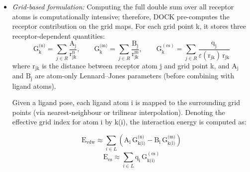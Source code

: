 \documentclass[12pt]{article}
\begin{document}
\begin{itemize}
For identical atoms with vdW radius R and well depth $\varepsilon$, DOCK employs a generalised Lennard--Jones expression:
 \begin{equation}
  V_{\text{LJ}}(r) = \varepsilon
    \left[
      C \left( \frac{R}{r} \right)^{n}
      -
      D \left( \frac{R}{r} \right)^{m}
    \right]
 \end{equation}
with exponents $n > m$ (e.g. n = 12, m = 6 or n = 9, m = 6).  Constants C and D are chosen such that:

\begin{equation}
\begin{aligned}
  V_{\textrm{LJ}}(r = R) &= -\varepsilon, \\
  \frac{\textrm{d} V_{\textrm{LJ}}}{\textrm{d}r}\biggr|_{r = R} &= 0
\end{aligned}
\end{equation}

which fixes the position and depth of the potential minimum while allowing the repulsive wall to be softened by reducing the 12-6 potentials to 9-6.

\item \emph{Grid-based formulation:}
Computing the full double sum over all receptor atoms is computationally intensive; therefore, DOCK pre-computes the receptor contribution on the grid maps\cite{CH7_Meng1992Grid}. For each grid point k, it stores three receptor-dependent
quantities:
\begin{equation}
  \textrm{G}^\textrm{(n)}_\textrm{k} = \sum_{j \in R}
    \frac{\textrm{A}_\textrm{j}}{\textrm{r}_\textrm{jk}^\textrm{n}},
  \qquad
  \textrm{G}^\textrm{(m)}_\textrm{k} = \sum_{j \in R}
    \frac{\textrm{B}_\textrm{j}}{\textrm{r}_\textrm{jk}^\textrm{m}}, 
     \qquad
  \textrm{G}^{(\textrm{es})}_\textrm{k} =
    \sum_{j \in R}
    \frac{\textrm{q}_\textrm{j}}{\varepsilon(\textrm{r}_\textrm{jk})\, \textrm{r}_\textrm{jk}}
\end{equation}
where $\textrm{r}_\textrm{jk}$ is the distance between receptor atom j and grid point k, and $\textrm{A}_\textrm{j}$ and $\textrm{B}_\textrm{j}$ are atom-only Lennard--Jones parameters (before combining with ligand atoms). 

Given a ligand pose, each ligand atom i is mapped to the surrounding grid points (via nearest-neighbour or trilinear
interpolation). Denoting the effective grid index for atom i by k(i), the interaction energy is computed as:

\begin{equation}
  \textrm{E}_{\textrm{vdw}} \approx
    \sum_{i \in L}
      \left(
        \textrm{A}_\textrm{i}\, \textrm{G}^\textrm{(n)}_\textrm{k(i)} -
        \textrm{B}_\textrm{i}\, \textrm{G}^\textrm{(m)}_\textrm{k(i)}
      \right)
\end{equation}
\begin{equation}
  \textrm{E}_{\textrm{es}} \approx
    \sum_{i \in L}
      \textrm{q}_\textrm{i}\, \textrm{G}^{(\textrm{es})}_\textrm{k(i)}
\end{equation}


\end{itemize}
\end{document}
